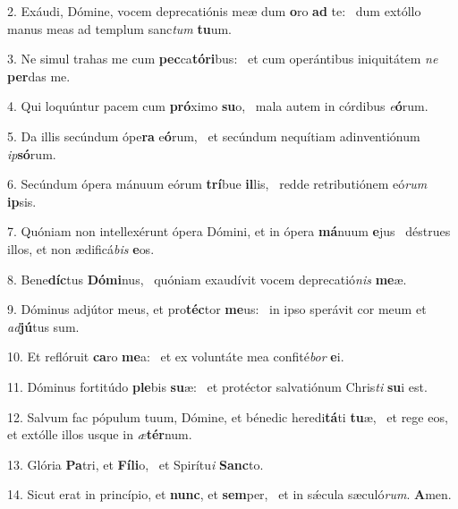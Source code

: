 2. Exáudi, Dómine, vocem deprecatiónis meæ dum \textbf{o}ro \textbf{ad} te: \ast\  dum extóllo manus meas ad templum sanc\textit{tum} \textbf{tu}um.\

3. Ne simul trahas me cum \textbf{pec}ca\textbf{tó}\textbf{ri}bus: \ast\  et cum operántibus iniquitátem \textit{ne} \textbf{per}das me.\

4. Qui loquúntur pacem cum \textbf{pró}ximo \textbf{su}o, \ast\  mala autem in córdibus \textit{e}\textbf{ó}rum.\

5. Da illis secúndum ópe\textbf{ra} e\textbf{ó}rum, \ast\  et secúndum nequítiam adinventiónum \textit{ip}\textbf{só}rum.\

6. Secúndum ópera mánuum eórum \textbf{trí}bue \textbf{il}lis, \ast\  redde retributiónem eó\textit{rum} \textbf{ip}sis.\

7. Quóniam non intellexérunt ópera Dómini, et in ópera \textbf{má}nuum \textbf{e}jus \ast\  déstrues illos, et non ædificá\textit{bis} \textbf{e}os.\

8. Bene\textbf{díc}tus \textbf{Dó}\textbf{mi}nus, \ast\  quóniam exaudívit vocem deprecatió\textit{nis} \textbf{me}æ.\

9. Dóminus adjútor meus, et pro\textbf{téc}tor \textbf{me}us: \ast\  in ipso sperávit cor meum et \textit{ad}\textbf{jú}tus sum.\

10. Et reflóruit \textbf{ca}ro \textbf{me}a: \ast\  et ex voluntáte mea confité\textit{bor} \textbf{e}i.\

11. Dóminus fortitúdo \textbf{ple}bis \textbf{su}æ: \ast\  et protéctor salvatiónum Chris\textit{ti} \textbf{su}i est.\

12. Salvum fac pópulum tuum, Dómine, et bénedic heredi\textbf{tá}ti \textbf{tu}æ, \ast\  et rege eos, et extólle illos usque in \textit{æ}\textbf{tér}num.\

13. Glória \textbf{Pa}tri, et \textbf{Fí}\textbf{li}o, \ast\  et Spirítu\textit{i} \textbf{Sanc}to.\

14. Sicut erat in princípio, et \textbf{nunc}, et \textbf{sem}per, \ast\  et in sǽcula sæculó\textit{rum}. \textbf{A}men.\

